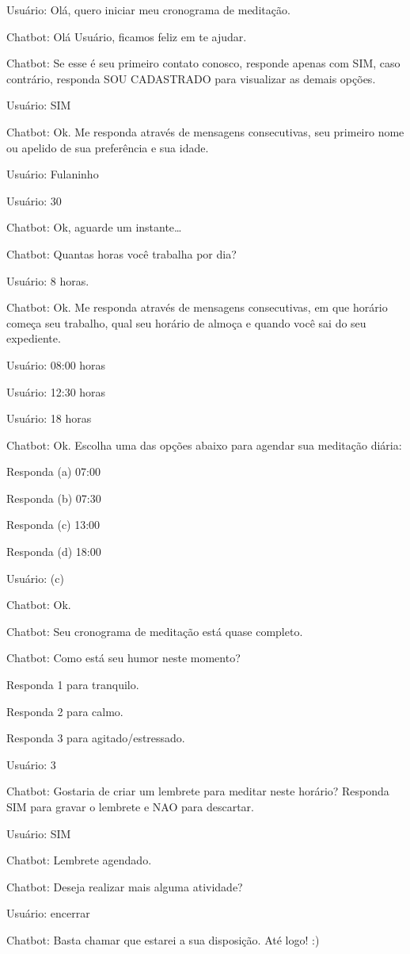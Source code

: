 Usuário: Olá, quero iniciar meu cronograma de meditação.

Chatbot: Olá Usuário, ficamos feliz em te ajudar.

Chatbot: Se esse é seu primeiro contato conosco, responde apenas com SIM, caso contrário, responda SOU CADASTRADO para visualizar as demais opções.


Usuário: SIM

Chatbot: Ok. Me responda através de mensagens consecutivas, seu primeiro nome ou apelido de sua preferência e sua idade.


Usuário: Fulaninho

Usuário: 30

Chatbot: Ok, aguarde um instante…

Chatbot: Quantas horas você trabalha por dia?

Usuário: 8 horas.

Chatbot: Ok. Me responda através de mensagens consecutivas, em que horário começa seu trabalho, qual seu horário de almoça e quando você sai do seu expediente.


Usuário: 08:00 horas

Usuário: 12:30 horas

Usuário: 18 horas

Chatbot: Ok. Escolha uma das opções abaixo para agendar sua meditação diária:

Responda (a) 07:00

Responda (b) 07:30

Responda (c) 13:00

Responda (d) 18:00

Usuário: (c)

Chatbot: Ok.

Chatbot: Seu cronograma de meditação está quase completo.

Chatbot: Como está seu humor neste momento?

Responda 1 para tranquilo.

Responda 2 para calmo.

Responda 3 para agitado/estressado.


Usuário: 3

Chatbot: Gostaria de criar um lembrete para meditar neste horário? Responda SIM para gravar o lembrete e NAO para descartar.

Usuário: SIM


Chatbot: Lembrete agendado.

Chatbot: Deseja realizar mais alguma atividade?

Usuário: encerrar

Chatbot: Basta chamar que estarei a sua disposição. Até logo! :)


